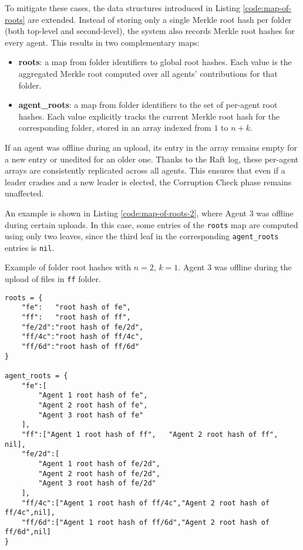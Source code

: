 To mitigate these cases, the data structures introduced in Listing \ref{code:map-of-roots} are extended. Instead of storing only a single Merkle root hash per folder (both top-level and second-level), the system also records Merkle root hashes for every agent. This results in two complementary maps:
\begin{itemize}
\item \textbf{roots}: a map from folder identifiers to global root hashes. Each value is the aggregated Merkle root computed over all agents' contributions for that folder.
\item \textbf{agent\_roots}: a map from folder identifiers to the set of per-agent root hashes. Each value explicitly tracks the current Merkle root hash for the corresponding folder, stored in an array indexed from $1$ to $n+k$.
\end{itemize}

If an agent was offline during an upload, its entry in the array remains empty for a new entry or unedited for an older one. Thanks to the Raft log, these per-agent arrays are consistently replicated across all agents. This ensures that even if a leader crashes and a new leader is elected, the Corruption Check phase remains unaffected.

An example is shown in Listing \ref{code:map-of-roots-2}, where Agent 3 was offline during certain uploads. In this case, some entries of the \texttt{roots} map are computed using only two leaves, since the third leaf in the corresponding \texttt{agent\_roots} entries is \texttt{nil}.

\begin{listing}[H]
\caption{Example of folder root hashes with $n=2$, $k=1$. Agent 3 was offline during the upload of files in \texttt{ff} folder.}
\label{code:map-of-roots-2}
\begin{verbatim}
roots = {
    "fe":   "root hash of fe",
    "ff":   "root hash of ff",
    "fe/2d":"root hash of fe/2d",
    "ff/4c":"root hash of ff/4c",
    "ff/6d":"root hash of ff/6d"
}

agent_roots = {
    "fe":[
        "Agent 1 root hash of fe",
        "Agent 2 root hash of fe",
        "Agent 3 root hash of fe"
    ],
    "ff":["Agent 1 root hash of ff",   "Agent 2 root hash of ff",   nil],
    "fe/2d":[
        "Agent 1 root hash of fe/2d",
        "Agent 2 root hash of fe/2d",
        "Agent 3 root hash of fe/2d"
    ],
    "ff/4c":["Agent 1 root hash of ff/4c","Agent 2 root hash of ff/4c",nil],
    "ff/6d":["Agent 1 root hash of ff/6d","Agent 2 root hash of ff/6d",nil]
}
\end{verbatim}
\end{listing}

